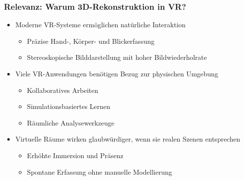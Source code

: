 \begin{frame}
\frametitle{Relevanz: Warum 3D-Rekonstruktion in VR?}

\begin{itemize}
  \item Moderne VR-Systeme ermöglichen natürliche Interaktion
  \begin{itemize}
    \item Präzise Hand-, Körper- und Blickerfassung
    \item Stereoskopische Bilddarstellung mit hoher Bildwiederholrate
  \end{itemize}
  
  \item Viele VR-Anwendungen benötigen Bezug zur physischen Umgebung
  \begin{itemize}
    \item Kollaboratives Arbeiten
    \item Simulationsbasiertes Lernen
    \item Räumliche Analysewerkzeuge
  \end{itemize}
  
  \item Virtuelle Räume wirken glaubwürdiger, wenn sie realen Szenen entsprechen
  \begin{itemize}
    \item Erhöhte Immersion und Präsenz
    \item Spontane Erfassung ohne manuelle Modellierung
  \end{itemize}
\end{itemize}

\end{frame}

